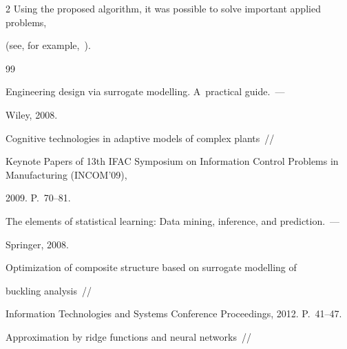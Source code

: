 \begin{multicols}{2}
Using the proposed algorithm, it was possible to solve important applied problems, 

(see, for example,~\cite{copti}).



{\small\frenchspacing

{%


\begin{thebibliography}{99}







    Engineering design via surrogate modelling. A~practical guide.~---

    Wiley, 2008.





  Cognitive technologies in adaptive models of complex plants~//

  Keynote Papers of 13th IFAC Symposium on Information Control Problems in Manufacturing (INCOM'09),

   2009. P.~70--81.





  The elements of statistical learning: Data mining, inference, and prediction.~---

  Springer, 2008.





 Optimization of composite structure based on surrogate modelling of

   buckling analysis~//

Information Technologies and Systems Conference Proceedings, 2012. P.~41--47.





{Approximation by ridge functions and neural networks}~// 


\end{thebibliography}}}
\end{multicols}
